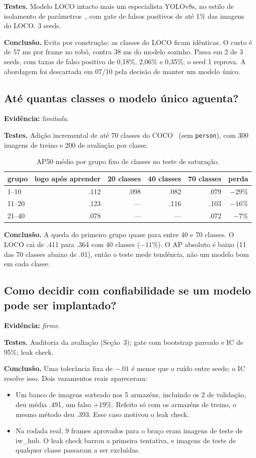 \documentclass[11pt,a4paper]{article}
\newcommand{\evidencia}[1]{\noindent\textbf{Evidência:} \emph{#1}.\par}
\newcommand{\testes}{\noindent\textbf{Testes.} }
\newcommand{\conclusao}{\noindent\textbf{Conclusão.} }
\begin{document}
\testes Modelo LOCO intacto mais um especialista YOLOv8s, no estilo de isolamento
de parâmetros~\cite{progressive}, com gate de falsos positivos de até 1\% das
imagens do LOCO. 3 seeds.

\conclusao Evita por construção: as classes do LOCO ficam idênticas. O custo é de
57 ms por frame no robô, contra 38 ms do modelo sozinho. Passa em 2 de 3 seeds,
com taxas de falso positivo de 0,18\%, 2,06\% e 0,35\%; o seed 1 reprova. A
abordagem foi descartada em 07/10 pela decisão de manter um modelo único.

\subsection{Até quantas classes o modelo único aguenta?}
\evidencia{limitada}

\testes Adição incremental de até 70 classes do COCO~\cite{coco} (sem
\texttt{person}), com 300 imagens de treino e 200 de avaliação por classe.

\begin{table}[H]
\centering\small
\caption{AP50 médio por grupo fixo de classes no teste de saturação.}
\begin{tabular}{lrrrrr}
\toprule
grupo & logo após aprender & 20 classes & 40 classes & 70 classes & perda \\
\midrule
1--10 & .112 & .098 & .082 & .079 & $-29\%$ \\
11--20 & .123 & --- & .116 & .103 & $-16\%$ \\
21--40 & .078 & --- & --- & .072 & $-7\%$ \\
\bottomrule
\end{tabular}
\end{table}

\conclusao A queda do primeiro grupo quase para entre 40 e 70 classes. O LOCO cai
de .411 para .364 com 40 classes ($-11\%$). O AP absoluto é baixo (11 das 70
classes abaixo de .01), então o teste mede tendência, não um modelo bom em cada
classe.

\subsection{Como decidir com confiabilidade se um modelo pode ser implantado?}
\evidencia{firme}

\testes Auditoria da avaliação (Seção~3); gate com bootstrap pareado e IC de 95\%;
leak check.

\conclusao Uma tolerância fixa de $-.01$ é menor que o ruído entre seeds; o IC
resolve isso. Dois vazamentos reais apareceram:
\begin{itemize}
  \item Um banco de imagens sorteado nos 5 armazéns, incluindo os 2 de validação,
    deu média .491, um falso +19\%. Refeito só com os armazéns de treino, o mesmo
    método deu .393. Esse caso motivou o leak check.
  \item Na rodada real, 9 frames aprovados para o braço eram imagens de teste de
    iw\_hub. O leak check barrou a primeira tentativa, e imagens de teste de
    qualquer classe passaram a ser excluídas.
\end{itemize}
\end{document}
